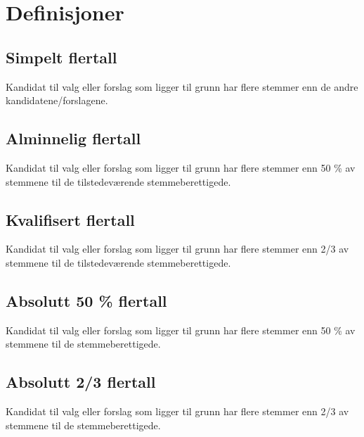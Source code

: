 \section{Definisjoner}
\subsection{Simpelt flertall}
Kandidat til valg eller forslag som ligger til grunn har flere stemmer enn de
andre kandidatene/forslagene.

\subsection{Alminnelig flertall}
Kandidat til valg eller forslag som ligger til grunn har flere stemmer enn 50 \%
av stemmene til de tilstedeværende stemmeberettigede.

\subsection{Kvalifisert flertall}
Kandidat til valg eller forslag som ligger til grunn har flere stemmer enn 2/3
av stemmene til de tilstedeværende stemmeberettigede.

\subsection{Absolutt 50 \% flertall}
Kandidat til valg eller forslag som ligger til grunn har flere stemmer enn 50 \%
av stemmene til de stemmeberettigede.

\subsection{Absolutt 2/3 flertall}
Kandidat til valg eller forslag som ligger til grunn har flere stemmer enn 2/3
av stemmene til de stemmeberettigede.
